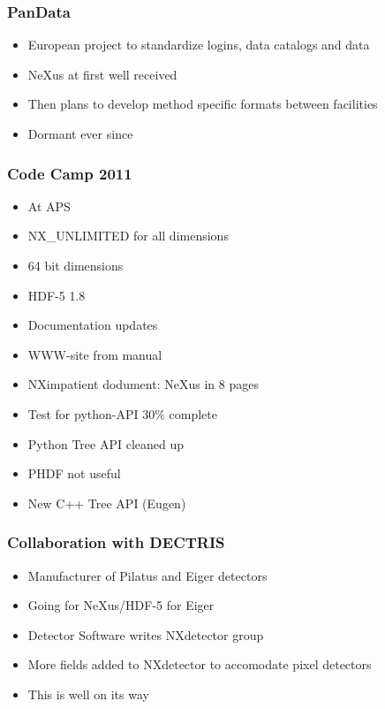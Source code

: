 \documentclass{beamer}
\begin{document}
\begin{frame}
\frametitle{PanData}
\begin{itemize}
\item European project to standardize logins, data catalogs and data
\item NeXus at first well received
\item Then plans to develop method specific formats between facilities
\item Dormant ever since
\end{itemize}
\end{frame}


\begin{frame}
\frametitle{Code Camp 2011}
\begin{itemize}
\item At APS 
\item NX\_UNLIMITED for all dimensions
\item 64 bit dimensions
\item HDF-5 1.8
\item Documentation updates
\item WWW-site from manual
\item NXimpatient dodument: NeXus in 8 pages
\item Test for python-API 30\% complete
\item Python Tree API cleaned up
\item PHDF not useful
\item New C++ Tree API (Eugen)
\end{itemize}
\end{frame}


\begin{frame}
\frametitle{Collaboration with DECTRIS}
\begin{itemize}
\item Manufacturer of Pilatus and Eiger detectors
\item Going for NeXus/HDF-5 for Eiger
\item Detector Software writes NXdetector group
\item More fields added to NXdetector to accomodate pixel detectors
\item This is well on its way
\end{itemize}
\end{frame}
\end{document}
